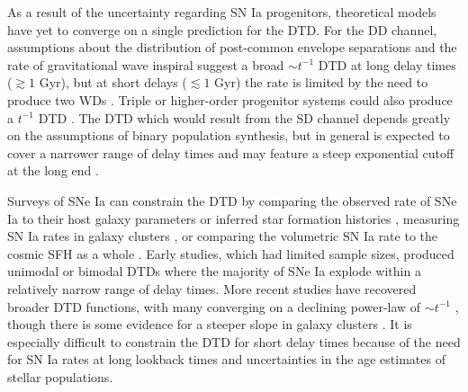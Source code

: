 \documentclass[twocolumn,twocolappendix,linenumbers]{aastex631}
\begin{document}
As a result of the uncertainty regarding SN Ia progenitors, theoretical models have yet to converge on a single prediction for the DTD.
For the DD channel, assumptions about the distribution of post-common envelope separations and the rate of gravitational wave inspiral suggest a broad $\sim t^{-1}$ DTD at long delay times ($\gtrsim 1$ Gyr), but at short delays ($\lesssim 1$ Gyr) the rate is limited by the need to produce two WDs \citep[see][]{Maoz2014-Review}.
Triple or higher-order progenitor systems could also produce a $t^{-1}$ DTD \citep{Fang2018-QuadrupleSystems,Rajamuthukumar2023-TripleEvolution}.
The DTD which would result from the SD channel depends greatly on the assumptions of binary population synthesis, but in general is expected to cover a narrower range of delay times and may feature a steep exponential cutoff at the long end \citep[e.g.,][]{Greggio2005-AnalyticalRates}.

Surveys of SNe Ia can constrain the DTD by comparing the observed rate of SNe Ia to their host galaxy parameters \citep[e.g.,][]{Mannucci2005-SNRate,Heringer2019-FieldGalaxyDTD} or inferred star formation histories \citep[SFHs; e.g.,][]{Maoz2012-SloanIIDTD}, measuring SN Ia rates in galaxy clusters \citep[e.g.,][]{Maoz2010-ClusterDTD}, or comparing the volumetric SN Ia rate to the cosmic SFH as a whole \citep[e.g.,][]{Graur2014-VolumetricSNIaRates,Strolger2020-ExponentialDTD}. 
Early studies, which had limited sample sizes, produced unimodal \citep{Strolger2004-SNIaProgenitors} or bimodal \citep{Mannucci2006-TwoPopulations} DTDs where the majority of SNe Ia explode within a relatively narrow range of delay times.
More recent studies have recovered broader DTD functions, with many converging on a declining power-law of $\sim t^{-1}$ \citep[e.g.,][]{Maoz2017-CosmicDTD,Castrillo2021-DTD,Wiseman2021-DESRates}, though there is some evidence for a steeper slope in galaxy clusters \citep{Maoz2017-CosmicDTD,FriedmannMaoz2018-ClusterDTD}.
It is especially difficult to constrain the DTD for short delay times \citep{MaozMannucci2012-SNeIaReview} because of the need for SN Ia rates at long lookback times and uncertainties in the age estimates of stellar populations.
\end{document}
